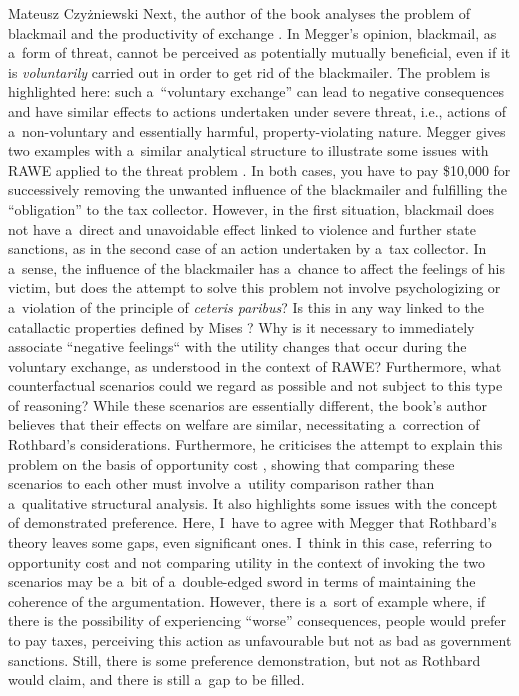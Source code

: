 \begin{newrevengenv}{Mateusz Czyżniewski}
Next, the author of the book analyses the problem of blackmail and the productivity of exchange 
\parencite[][pp.62–67]{megger_sprawiedliwosc_2021}. %
 In Megger's opinion, blackmail, as a~form of threat, cannot be perceived as potentially mutually beneficial, even if it is \textit{voluntarily} carried out in order to get rid of the blackmailer. The problem is highlighted here: such a~``voluntary exchange'' can lead to negative consequences and have similar effects to actions undertaken under severe threat, i.e., actions of a~non-voluntary and essentially harmful, property-violating nature. Megger gives two examples with a~similar analytical structure to illustrate some issues with RAWE applied to the threat problem 
\parencite[][p.63]{megger_sprawiedliwosc_2021}. %
 In both cases, you have to pay \$10,000 for successively removing the unwanted influence of the blackmailer and fulfilling the ``obligation'' to the tax collector. However, in the first situation, blackmail does not have a~direct and unavoidable effect linked to violence and further state sanctions, as in the second case of an action undertaken by a~tax collector. In a~sense, the influence of the blackmailer has a~chance to affect the feelings of his victim, but does the attempt to solve this problem not involve psychologizing or a~violation of the principle of \textit{ceteris paribus}? Is this in any way linked to the catallactic properties defined by Mises 
\parencite*[][pp.233–257]{mises_human_1998}? %
 Why is it necessary to immediately associate ``negative feelings`` with the utility changes that occur during the voluntary exchange, as understood in the context of RAWE? Furthermore, what counterfactual scenarios could we regard as possible and not subject to this type of reasoning? While these scenarios are essentially different, the book's author believes that their effects on welfare are similar, necessitating a~correction of Rothbard's considerations. Furthermore, he criticises the attempt to explain this problem on the basis of opportunity cost 
\parencite[][p.64]{megger_sprawiedliwosc_2021}, %
 showing that comparing these scenarios to each other must involve a~utility comparison rather than a~qualitative structural analysis. It also highlights some issues with the concept of demonstrated preference. Here, I~have to agree with Megger that Rothbard's theory leaves some gaps, even significant ones. I~think in this case, referring to opportunity cost and not comparing utility in the context of invoking the two scenarios may be a~bit of a~double-edged sword in terms of maintaining the coherence of the argumentation. However, there is a~sort of example where, if there is the possibility of experiencing ``worse'' consequences, people would prefer to pay taxes, perceiving this action as unfavourable but not as bad as government sanctions. Still, there is some preference demonstration, but not as Rothbard would claim, and there is still a~gap to be filled.




\end{newrevengenv}
